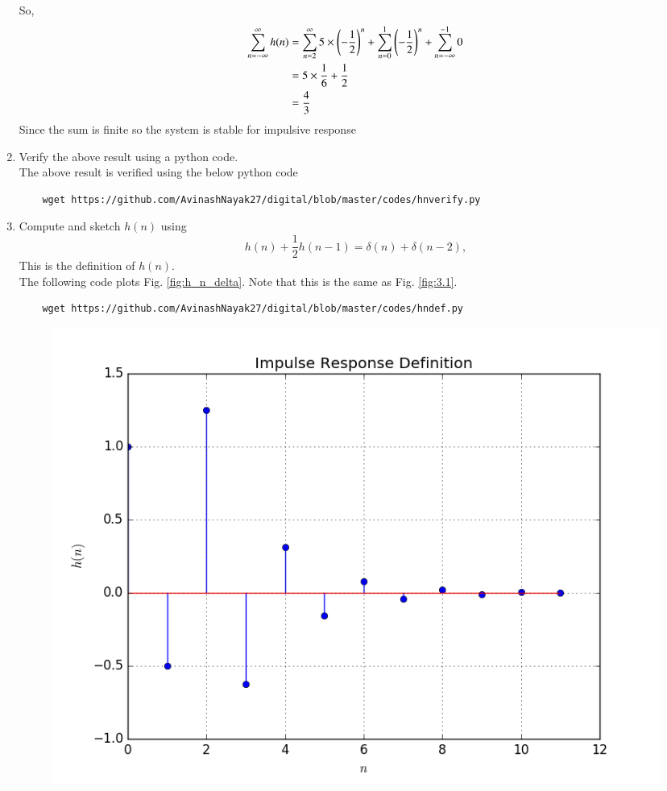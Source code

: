 \documentclass[journal,12pt,twocolumn]{IEEEtran}
\renewcommand\thesection{\arabic{section}}
\begin{document}
\begin{enumerate}[label=\thesection.\arabic*]
      So,
      \begin{align}
        \sum_{n=-\infty}^{\infty}h(n)&=\sum_{n=2}^{\infty}5\times \left(-\frac{1}{2}\right)^n+\sum_{n=0}^{1} \left(-\frac{1}{2}\right)^n+\sum_{n=-\infty}^{-1}0\\
        &=5\times \frac{1}{6}+\frac{1}{2}\\
        &=\frac{4}{3}
      \end{align}
      Since the sum is finite so the system is stable for impulsive response
      \item Verify the above result using a python code.\\
      \solution The above result is verified using the below python code
        \begin{lstlisting}
    wget https://github.com/AvinashNayak27/digital/blob/master/codes/hnverify.py
      \end{lstlisting}
      \item 
      Compute and sketch $h(n)$ using 
      \begin{equation}
        \label{eq:iir_filter_h}
        h(n) + \frac{1}{2}h(n-1) = \delta(n) + \delta(n-2), 
      \end{equation}
      This is the definition of $h(n)$.
      \\
      \solution The following code plots Fig. \ref{fig:h_n_delta}. Note that this is the same as Fig. 
      \ref{fig:3.1}. 
      \begin{lstlisting}
    wget https://github.com/AvinashNayak27/digital/blob/master/codes/hndef.py
      \end{lstlisting}
      \begin{figure}[!ht]
        \centering
        \includegraphics[width=\columnwidth]{figs/hndef.png}

\end{figure}
\end{enumerate}
\end{document}

